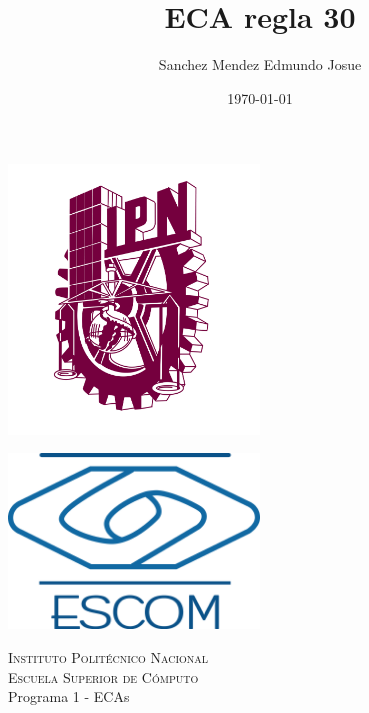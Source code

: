 \documentclass[11pt]{article}
\date{\today}
\title{ECA regla 30}
\author{Sanchez Mendez Edmundo Josue}
\begin{document}
		\begin{titlepage}
			\begin{center}
				
				
				\noindent
				\begin{minipage}{0.5\textwidth}
					\begin{flushleft} \large
						\includegraphics[width=0.5\textwidth]{resources/ipn.png}
					\end{flushleft}
				\end{minipage}%
				\begin{minipage}{0.55\textwidth}
					\begin{flushright} \large
						\includegraphics[width=0.5\textwidth]{resources/escom.png}
					\end{flushright}
				\end{minipage}
				
				\textsc{\LARGE Instituto Politécnico Nacional}\\[0.5cm]
				
				\textsc{\Large Escuela Superior de Cómputo}\\[1cm]
				
				
				{ \huge Programa 1 - ECAs  \\[1cm] }
				

\end{center}
\end{titlepage}
\end{document}
